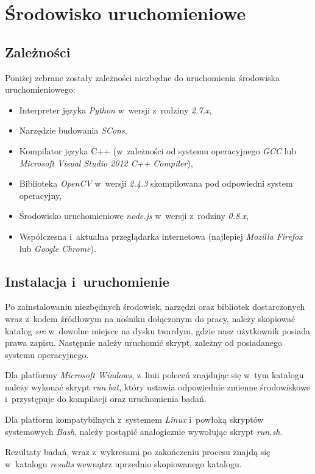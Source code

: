 \chapter{Środowisko uruchomieniowe}\label{Chapter_EnvironmentAppendix}
  \section{Zależności}\label{Section_Dependencies}

  Poniżej zebrane zostały zależności niezbędne do uruchomienia środowiska uruchomieniowego:
  \begin{itemize}
    \item Interpreter języka \textit{Python} w~wersji z~rodziny \textit{2.7.x},
    \item Narzędzie budowania \textit{SCons},
    \item Kompilator języka C++ (w~zależności od systemu operacyjnego \textit{GCC} lub \textit{Microsoft Visual Studio 2012 C++ Compiler}),
    \item Biblioteka \textit{OpenCV} w~wersji \textit{2.4.3} skompilowana pod odpowiedni system operacyjny,
    \item Środowisko uruchomieniowe \textit{node.js} w~wersji z~rodziny \textit{0.8.x},
    \item Współczesna i~aktualna przeglądarka internetowa (najlepiej \textit{Mozilla Firefox} lub \textit{Google Chrome}).
  \end{itemize}

  \section{Instalacja i~uruchomienie}\label{Section_Installation}

  Po zainstalowaniu niezbędnych środowisk, narzędzi oraz bibliotek dostarczonych wraz z~kodem źródłowym na nośniku dołączonym do pracy, należy skopiować katalog \textit{src} w~dowolne miejsce na dysku twardym, gdzie nasz użytkownik posiada prawa zapisu. Następnie należy uruchomić skrypt, zależny od posiadanego systemu operacyjnego.

  Dla platformy \textit{Microsoft Windows}, z~linii poleceń znajdując się w~tym katalogu należy wykonać skrypt \textit{run.bat}, który ustawia odpowiednie zmienne środowiskowe i~przystępuje do kompilacji oraz uruchomienia badań.

  Dla platform kompatybilnych z~systemem \textit{Linux} i~powłoką skryptów systemowych \textit{Bash}, należy postąpić analogicznie wywołując skrypt \textit{run.sh}.

  Rezultaty badań, wraz z~wykresami po zakończeniu procesu znajdą się w~katalogu \textit{results} wewnątrz uprzednio skopiowanego katalogu.